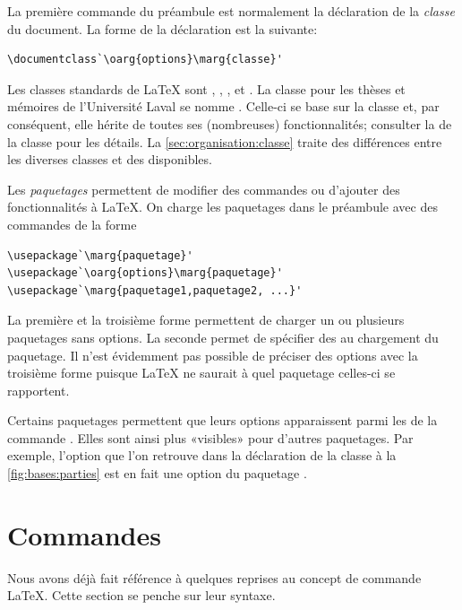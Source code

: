 La première commande du préambule est normalement la déclaration de la
\emph{classe} du document. La forme de la déclaration est la suivante:
\begin{lstlisting}
\documentclass`\oarg{options}\marg{classe}'
\end{lstlisting}
Les classes standards de {\LaTeX} sont ,
, ,  et . La
classe pour les thèses et mémoires de l'Université Laval se nomme
 \citep{ulthese}. Celle-ci se base sur la classe
 et, par conséquent, elle hérite de toutes ses (nombreuses)
fonctionnalités; consulter la %
de la classe  pour les détails. La
\autoref{sec:organisation:classe} traite des différences entre les
diverses classes et des  disponibles.

Les \emph{paquetages} permettent de modifier des commandes ou
d'ajouter des fonctionnalités à {\LaTeX}. On charge les paquetages
dans le préambule avec des commandes de la forme
\begin{lstlisting}
\usepackage`\marg{paquetage}'
\usepackage`\oarg{options}\marg{paquetage}'
\usepackage`\marg{paquetage1,paquetage2, ...}'
\end{lstlisting}
La première et la troisième forme permettent de charger un ou
plusieurs paquetages sans options. La seconde permet de spécifier des
 au chargement du paquetage. Il n'est évidemment pas
possible de préciser des options avec la troisième forme puisque
{\LaTeX} ne saurait à quel paquetage celles-ci se rapportent.

Certains paquetages permettent que leurs options apparaissent parmi
les  de la commande \cmdprint{\documentclass}. Elles
sont ainsi plus «visibles» pour d'autres paquetages. Par exemple,
l'option  que l'on retrouve dans la déclaration de la
classe à la \autoref{fig:bases:parties} est en fait une option du
paquetage .


\section{Commandes}
\label{sec:bases:commandes}

Nous avons déjà fait référence à quelques reprises au concept de
commande {\LaTeX}. Cette section se penche sur leur syntaxe.

